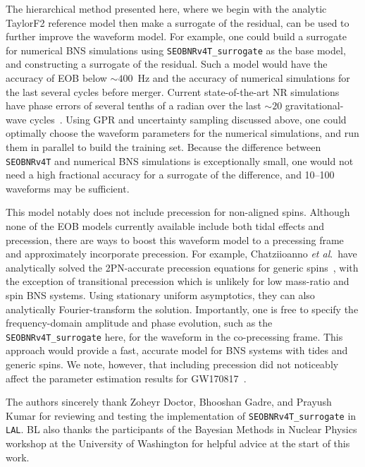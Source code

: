 \documentclass[prd,aps,letter,twocolumn,floatfix,notitlepage,nofootinbib]{revtex4-1}
\begin{document}
The hierarchical method presented here, where we begin with the analytic TaylorF2 reference model then make a surrogate of the residual, can be used to further improve the waveform model. For example, one could build a surrogate for numerical BNS simulations using \texttt{SEOBNRv4T\_surrogate} as the base model, and constructing a surrogate of the residual. Such a model would have the accuracy of EOB below $\sim 400$~Hz and the accuracy of numerical simulations for the last several cycles before merger. Current state-of-the-art NR simulations have phase errors of several tenths of a radian over the last $\sim 20$ gravitational-wave cycles~\cite{DietrichHinderer2017, KiuchiKawaguchiKyutoku2017}. Using GPR and uncertainty sampling discussed above, one could optimally choose the waveform parameters for the numerical simulations, and run them in parallel to build the training set. Because the difference between \texttt{SEOBNRv4T} and numerical BNS simulations is exceptionally small, one would not need a high fractional accuracy for a surrogate of the difference, and 10--100 waveforms may be sufficient.

This model notably does not include precession for non-aligned spins. Although none of the EOB models currently available include both tidal effects and precession, there are ways to boost this waveform model to a precessing frame and approximately incorporate precession. For example, Chatziioanno {\it et al}.\ have analytically solved the 2PN-accurate precession equations for generic spins~\cite{ChatziioannouKleinCornish2017a, ChatziioannouKleinCornish2017b}, with the exception of transitional precession which is unlikely for low mass-ratio and spin BNS systems. Using stationary uniform asymptotics, they can also analytically Fourier-transform the solution. Importantly, one is free to specify the frequency-domain amplitude and phase evolution, such as the \texttt{SEOBNRv4T\_surrogate} here, for the waveform in the co-precessing frame. This approach would provide a fast, accurate model for BNS systems with tides and generic spins. We note, however, that including precession did not noticeably affect the parameter estimation results for GW170817~\cite{BNSPE}.


\begin{acknowledgments}

The authors sincerely thank Zoheyr Doctor, Bhooshan Gadre, and Prayush Kumar for reviewing and testing the implementation of \texttt{SEOBNRv4T\_surrogate} in \texttt{LAL}. BL also thanks the participants of the Bayesian Methods in Nuclear Physics workshop at the University of Washington for helpful advice at the start of this work.

\end{acknowledgments}
\end{document}
